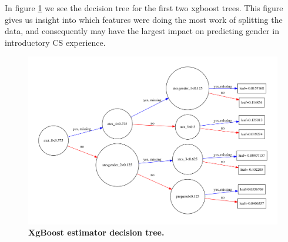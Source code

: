 In figure \ref{plot_tree} we see the decision tree for the first two xgboost trees. This figure gives us insight into which features were doing the most work of splitting the data, and consequently may have the largest impact on predicting gender in introductory CS experience.


\begin{figure}[!hbtp]
\centering
    \includegraphics[width=1\textwidth]{figures/X_graph}
    \caption{\textbf{XgBoost estimator decision tree. }\textit{}}\label{plot_tree}
\end{figure}



